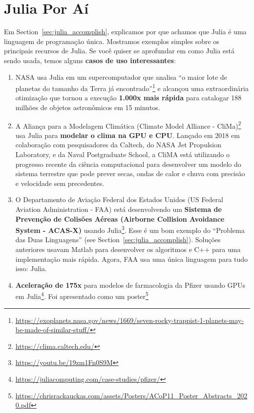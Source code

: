 \documentclass[
  notoc %
]{tufte-book}
\DeclareRobustCommand{\href}[2]{#2\footnote{\url{#1}}}
\providecommand{\tightlist}{%
  \setlength{\itemsep}{0pt}\setlength{\parskip}{0pt}
}
\begin{document}
\hypertarget{sec:julia_wild}{%
\section{Julia Por Aí}\label{sec:julia_wild}}

Em Section~\ref{sec:julia_accomplish}, explicamos por que achamos que
Julia é uma linguagem de programação única. Mostramos exemplos simples
sobre os principais recursos de Julia. Se você quiser se aprofundar em
como Julia está sendo usada, temos alguns \textbf{casos de uso
interessantes}:

\begin{enumerate}
\def\labelenumi{\arabic{enumi}.}
\tightlist
\item
  NASA usa Julia em um supercomputador que analisa
  \href{https://exoplanets.nasa.gov/news/1669/seven-rocky-trappist-1-planets-may-be-made-of-similar-stuff/}{``o
  maior lote de planetas do tamanho da Terra já encontrado''} e alcançou
  uma extraordinária otimização que tornou a execução \textbf{1.000x
  mais rápida} para catalogar 188 milhões de objetos astronômicos em 15
  minutos.
\item
  \href{https://clima.caltech.edu/}{A Aliança para a Modelagem Climática
  (Climate Model Alliance - CliMa)} usa Julia para \textbf{modelar o
  clima na GPU e CPU}. Lançado em 2018 em colaboração com pesquisadores
  da Caltech, do NASA Jet Propulsion Laboratory, e da Naval Postgraduate
  School, a CliMA está utilizando o progresso recente da ciência
  computacional para desenvolver um modelo do sistema terrestre que pode
  prever secas, ondas de calor e chuva com precisão e velocidade sem
  precedentes.
\item
  \href{https://youtu.be/19zm1Fn0S9M}{O Departamento de Aviação Federal
  dos Estados Unidos (US Federal Aviation Administration - FAA) está
  desenvolvendo um \textbf{Sistema de Prevenção de Colisões Aéreas
  (Airborne Collision Avoidance System - ACAS-X)} usando Julia}. Esse é
  um bom exemplo do ``Problema das Duas Linguagens'' (see
  Section~\ref{sec:julia_accomplish}). Soluções anteriores usavam Matlab
  para desenvolver os algoritmos e C++ para uma implementação mais
  rápida. Agora, FAA usa uma única linguagem para tudo isso: Julia.
\item
  \href{https://juliacomputing.com/case-studies/pfizer/}{\textbf{Aceleração
  de 175x} para modelos de farmacologia da Pfizer usando GPUs em Julia}.
  Foi apresentado como um
  \href{https://chrisrackauckas.com/assets/Posters/ACoP11_Poster_Abstracts_2020.pdf}{poster}

\end{enumerate}
\end{document}
